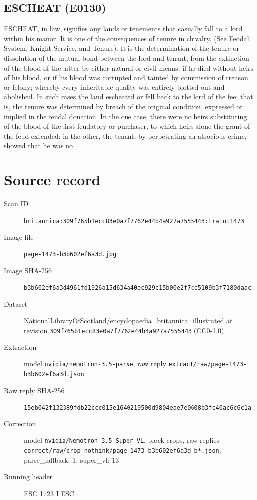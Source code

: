 \documentclass{article}
\begin{document}
\subsection*{ESCHEAT (E0130)}
ESCHEAT, in law, signifies any lands or tenements that casually fall to a lord within his manor. It is one of the consequences of tenure in chivalry. (See Feodal System, Knight-Service, and Tenure). It is the determination of the tenure or dissolution of the mutual bond between the lord and tenant, from the extinction of the blood of the latter by either natural or civil means: if he died without heirs of his blood, or if his blood was corrupted and tainted by commission of treason or felony; whereby every inheritable quality was entirely blotted out and abolished. In such cases the land escheated or fell back to the lord of the fee; that is, the tenure was determined by breach of the original condition, expressed or implied in the feudal donation. In the one case, there were no heirs substituting of the blood of the first feudatory or purchaser, to which heirs alone the grant of the feud extended: in the other, the tenant, by perpetrating an atrocious crime, showed that he was no


\section*{Source record}
\begin{description}
\item[Scan ID] \texttt{britannica:309f765b1ecc83e0a7f7762e44b4a927a7555443:train:1473}
\item[Image file] \texttt{page-1473-b3b602ef6a3d.jpg}
\item[Image SHA-256] \texttt{b3b602ef6a3d4961fd1926a15d634a40ec929c15b00e2f7cc5109b3f7180daac}
\item[Dataset] NationalLibraryOfScotland/encyclopaedia\_britannica\_illustrated at revision \texttt{309f765b1ecc83e0a7f7762e44b4a927a7555443} (CC0-1.0)
\item[Extraction] model \texttt{nvidia/nemotron-3.5-parse}, raw reply \texttt{extract/raw/page-1473-b3b602ef6a3d.json}
\item[Raw reply SHA-256] \texttt{15eb042f132389fdb22ccc015e1640219500d9804eae7e0608b3fc40ac6c6c1a}
\item[Correction] model \texttt{nvidia/Nemotron-3.5-Super-VL}, block crops, raw replies \texttt{correct/raw/crop\_nothink/page-1473-b3b602ef6a3d-b*.json}; parse\_fallback: 1, super\_vl: 13
\item[Running header] ESC 1723 I ESC
\end{description}
\end{document}
